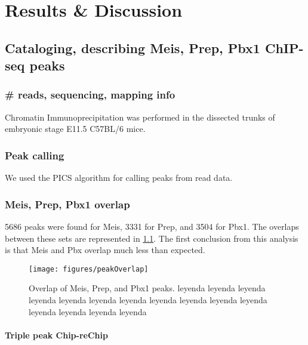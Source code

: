 \chapter{Results \& Discussion}
\label{chp:results}

\section{Cataloging, describing Meis, Prep, Pbx1 ChIP-seq peaks}

\subsection{\# reads, sequencing, mapping info}
Chromatin Immunoprecipitation was performed in the dissected trunks of embryonic stage E11.5 C57BL/6 mice.





\subsection{Peak calling}

We used the PICS algorithm for calling peaks from read data.

\subsection{Meis, Prep, Pbx1 overlap}

5686 peaks were found for Meis, 3331 for Prep, and 3504 for Pbx1. The overlaps between these sets are represented in \ref{fig:peakOverlap}. The first conclusion from this analysis is that Meis and Pbx overlap much less than expected. 


\begin{figure}[]
  
  \centering
  \label{fig:peakOverlap}
  \texttt{[image: figures/peakOverlap]}
  \caption[Overlap of Meis, Prep, and Pbx1 peaks]{Overlap of Meis, Prep, and Pbx1 peaks.  leyenda leyenda leyenda leyenda leyenda leyenda leyenda leyenda leyenda leyenda leyenda leyenda leyenda leyenda leyenda}
\end{figure}






\subsubsection{Triple peak Chip-reChip}

